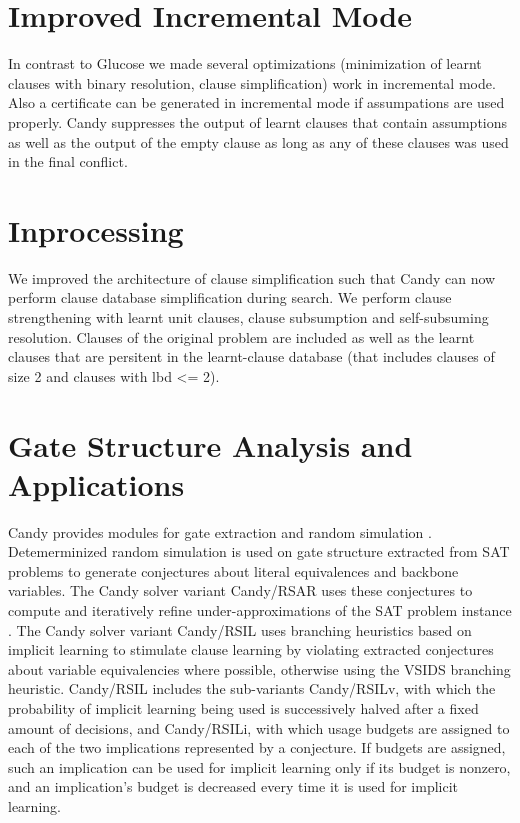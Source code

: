 \documentclass[conference]{IEEEtran}
\begin{document}
\section{Improved Incremental Mode}

In contrast to Glucose we made several optimizations (minimization of learnt clauses with binary resolution, clause simplification) work in incremental mode. Also a certificate can be generated in incremental mode if assumpations are used properly. Candy suppresses the output of learnt clauses that contain assumptions as well as the output of the empty clause as long as any of these clauses was used in the final conflict. 

\section{Inprocessing}

We improved the architecture of clause simplification such that Candy can now perform clause database simplification during search. We perform clause strengthening with learnt unit clauses, clause subsumption and self-subsuming resolution. Clauses of the original problem are included as well as the learnt clauses that are persitent in the learnt-clause database (that includes clauses of size 2 and clauses with lbd <= 2). 

\section{Gate Structure Analysis and Applications}

Candy provides modules for gate extraction \cite{Iser:2015:GateRecognition} and random simulation \cite{krohm1996use}.
Detemerminized random simulation is used on gate structure extracted from SAT problems to generate conjectures about literal equivalences and backbone variables.
The Candy solver variant Candy/RSAR uses these conjectures to compute and iteratively refine under-approximations of the SAT problem instance \cite{Kutzer:2016:Thesis}.
The Candy solver variant Candy/RSIL uses branching heuristics based on implicit learning \cite{Kutzer:2016:Thesis,DBLP:journals/jucs/LuWCMH04} to stimulate clause learning by violating extracted conjectures about variable equivalencies where possible, otherwise using the VSIDS branching heuristic.
Candy/RSIL includes the sub-variants Candy/RSILv, with which the probability of implicit learning being used is successively halved after a fixed amount of decisions, and Candy/RSILi, with which usage budgets are assigned to each of the two implications represented by a conjecture.
If budgets are assigned, such an implication can be used for implicit learning only if its budget is nonzero, and an implication's budget is decreased every time it is used for implicit learning.
\end{document}

